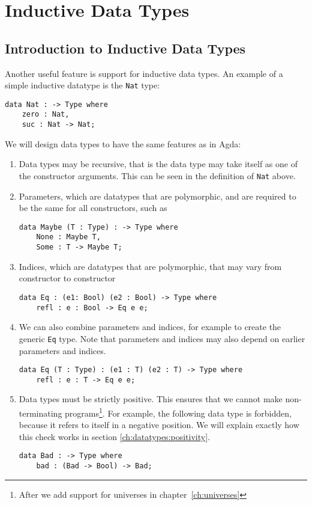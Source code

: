 \chapter{Inductive Data Types}
\label{ch:datatypes}

\section{Introduction to Inductive Data Types}
\label{ch:datatypes:intro}

Another useful feature is support for inductive data types. An example of a simple inductive datatype is the \verb|Nat| type:
\begin{lstlisting}
data Nat : -> Type where
    zero : Nat,
    suc : Nat -> Nat;
\end{lstlisting}
We will design data types to have the same features as in Agda:
\begin{enumerate}
\item Data types may be recursive, that is the data type may take itself as one of the constructor arguments. This can be seen in the definition of \verb|Nat| above.
\item Parameters, which are datatypes that are polymorphic, and are required to be the same for all constructors, such as
\begin{lstlisting}
data Maybe (T : Type) : -> Type where
    None : Maybe T,
    Some : T -> Maybe T;
\end{lstlisting}
\item Indices, which are datatypes that are polymorphic, that may vary from constructor to constructor
\begin{lstlisting}
data Eq : (e1: Bool) (e2 : Bool) -> Type where
    refl : e : Bool -> Eq e e;
\end{lstlisting}
\item We can also combine parameters and indices, for example to create the generic \verb|Eq| type. Note that parameters and indices may also depend on earlier parameters and indices.
\begin{lstlisting}
data Eq (T : Type) : (e1 : T) (e2 : T) -> Type where
    refl : e : T -> Eq e e;
\end{lstlisting}
\item Data types must be strictly positive. This ensures that we cannot make non-terminating programs\footnote{After we add support for universes in chapter~\ref{ch:universes}}. For example, the following data type is forbidden, because it refers to itself in a negative position. We will explain exactly how this check works in section \ref{ch:datatypes:positivity}.
\begin{lstlisting}
data Bad : -> Type where
	bad : (Bad -> Bool) -> Bad;
\end{lstlisting}
\end{enumerate}

